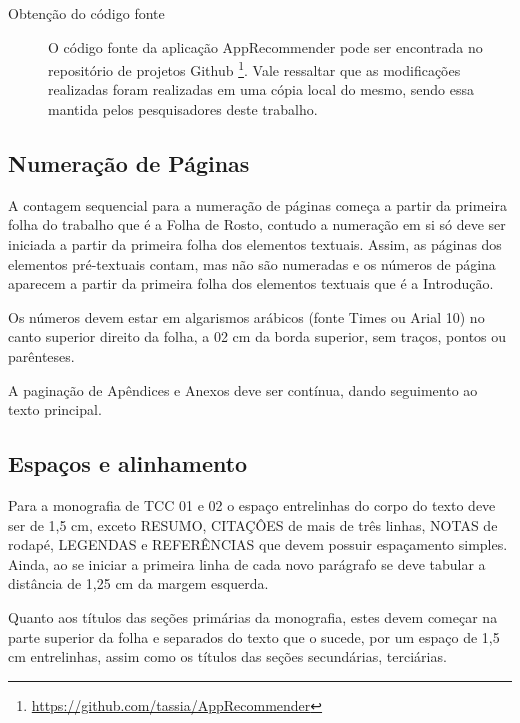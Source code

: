 \begin{description}

\item[Obtenção do código fonte]

O código fonte da aplicação AppRecommender pode ser encontrada no repositório de projetos Github \footnote{\url{https://github.com/tassia/AppRecommender}}.
Vale ressaltar que as modificações realizadas foram realizadas em uma cópia local do mesmo, sendo essa mantida pelos pesquisadores deste trabalho.

\end{description}

    


\subsection{Numeração de Páginas}

A contagem sequencial para a numeração de páginas começa a partir da 
primeira folha do trabalho que é a Folha de Rosto, contudo a numeração em 
si só deve ser iniciada a partir da primeira folha dos elementos textuais. 
Assim, as páginas dos elementos pré-textuais contam, mas não são numeradas 
e os números de página aparecem a partir da primeira folha dos elementos 
textuais que é a Introdução. 

Os números devem estar em algarismos arábicos (fonte Times ou Arial 10) no 
canto superior direito da folha, a 02 cm da borda superior, sem traços, 
pontos ou parênteses. 

A paginação de Apêndices e Anexos deve ser contínua, dando seguimento ao 
texto principal.

\subsection{Espaços e alinhamento}

Para a monografia de TCC 01 e 02 o espaço entrelinhas do corpo do texto 
deve ser de 1,5 cm, exceto RESUMO, CITAÇÔES de mais de três linhas, NOTAS 
de rodapé, LEGENDAS e REFERÊNCIAS que devem possuir espaçamento simples. 
Ainda, ao se iniciar a primeira linha de cada novo parágrafo se deve 
tabular a distância de 1,25 cm da margem esquerda.

Quanto aos títulos das seções primárias da monografia, estes devem começar 
na parte superior da folha e separados do texto que o sucede, por um espaço 
de 1,5 cm entrelinhas, assim como os títulos das seções secundárias, 
terciárias. 

